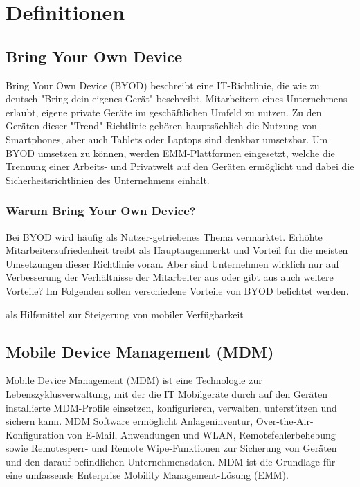\chapter{Definitionen}
\label{cha:Definitionen}

\section{Bring Your Own Device}
Bring Your Own Device (BYOD) beschreibt eine IT-Richtlinie, die wie zu deutsch "Bring dein eigenes Gerät" beschreibt, Mitarbeitern eines Unternehmens erlaubt, eigene private Geräte im geschäftlichen Umfeld zu nutzen. Zu den Geräten dieser "Trend"-Richtlinie gehören hauptsächlich die Nutzung von Smartphones, aber auch Tablets oder Laptops sind denkbar umsetzbar. Um BYOD umsetzen zu können, werden EMM-Plattformen eingesetzt, welche die Trennung einer Arbeits- und Privatwelt auf den Geräten ermöglicht und dabei die Sicherheitsrichtlinien des Unternehmens einhält.

\subsection{Warum Bring Your Own Device?}
Bei BYOD wird häufig als Nutzer-getriebenes Thema vermarktet. Erhöhte Mitarbeiterzufriedenheit treibt als Hauptaugenmerkt und Vorteil für die meisten Umsetzungen dieser Richtlinie voran. Aber sind Unternehmen wirklich nur auf Verbesserung der Verhältnisse der Mitarbeiter aus oder gibt aus auch weitere Vorteile? Im Folgenden sollen verschiedene Vorteile von BYOD belichtet werden.





als Hilfsmittel zur Steigerung von mobiler Verfügbarkeit

\section{Mobile Device Management (MDM)}
Mobile Device Management (MDM) ist eine Technologie zur Lebenszyklusverwaltung, mit der die IT Mobilgeräte durch auf den Geräten installierte MDM-Profile einsetzen, konfigurieren, verwalten, unterstützen und sichern kann. MDM Software ermöglicht Anlageninventur, Over-the-Air-Konfiguration von E-Mail, Anwendungen und WLAN, Remotefehlerbehebung sowie Remotesperr- und Remote Wipe-Funktionen zur Sicherung von Geräten und den darauf befindlichen Unternehmensdaten. MDM ist die Grundlage für eine umfassende Enterprise Mobility Management-Lösung (EMM). 

